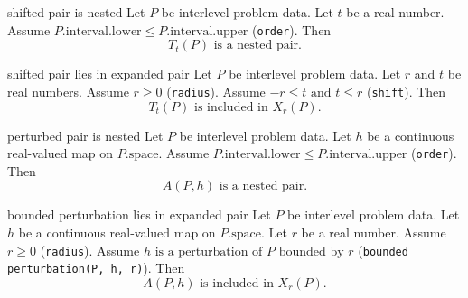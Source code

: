 \begin{cleanresult}{shifted pair is nested}
Let $P$ be interlevel problem data.
Let $t$ be a real number.
Assume $P.\mathrm{interval}.\mathrm{lower}\le P.\mathrm{interval}.\mathrm{upper}$ (\texttt{order}).
Then \[T_{t}(P)\text{ is a nested pair}.\]
\par{}
\end{cleanresult}

\begin{cleanresult}{shifted pair lies in expanded pair}
Let $P$ be interlevel problem data.
Let $r$ and $t$ be real numbers.
Assume $r\ge 0$ (\texttt{radius}).
Assume $-r\le t\text{ and }t\le r$ (\texttt{shift}).
Then \[T_{t}(P)\text{ is included in }X_{r}(P).\]
\par{}
\end{cleanresult}

\begin{cleanresult}{perturbed pair is nested}
Let $P$ be interlevel problem data.
Let $h$ be a continuous real-valued map on $P.\mathrm{space}$.
Assume $P.\mathrm{interval}.\mathrm{lower}\le P.\mathrm{interval}.\mathrm{upper}$ (\texttt{order}).
Then \[A(P,h)\text{ is a nested pair}.\]
\par{}
\end{cleanresult}

\begin{cleanresult}{bounded perturbation lies in expanded pair}
Let $P$ be interlevel problem data.
Let $h$ be a continuous real-valued map on $P.\mathrm{space}$.
Let $r$ be a real number.
Assume $r\ge 0$ (\texttt{radius}).
Assume $h\text{ is a perturbation of }P\text{ bounded by }r$ (\texttt{bounded perturbation(P, h, r)}).
Then \[A(P,h)\text{ is included in }X_{r}(P).\]
\par{}
\end{cleanresult}

